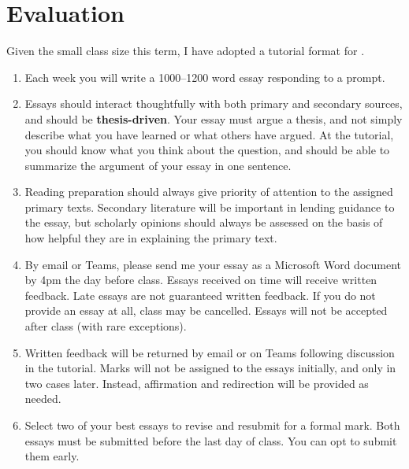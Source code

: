 \documentclass[titlepage]{article}
\begin{document}
\section{Evaluation}
\label{evaluation}

Given the small class size this term, I have adopted a tutorial format
for \ccode.

\begin{enumerate}

	\item Each week you will write a 1000–1200 word essay responding to
	a prompt.

	\item Essays should interact thoughtfully with both primary and
	secondary sources, and should be \textbf{thesis-driven}. Your essay
	must argue a thesis, and not simply describe what you have learned
	or what others have argued. At the tutorial, you should know what
	you think about the question, and should be able to summarize the
	argument of your essay in one sentence.

	\item Reading preparation should always give priority of attention
	to the assigned primary texts. Secondary literature will be
	important in lending guidance to the essay, but scholarly opinions
	should always be assessed on the basis of how helpful they are in
	explaining the primary text.

	\item By email or Teams, please send me your essay as a Microsoft
	Word document by 4pm the day before class. Essays received on time
	will receive written feedback. Late essays are not guaranteed
	written feedback. If you do not provide an essay at all, class may
	be cancelled. Essays will not be accepted after class (with rare
	exceptions).

	\item Written feedback will be returned by email or on Teams
	following discussion in the tutorial. Marks will not be assigned to
	the essays initially, and only in two cases later. Instead,
	affirmation and redirection will be provided as needed.

	\item Select two of your best essays to revise and resubmit for a
	formal mark. Both essays must be submitted before the last day of
	class. You can opt to submit them early.


\end{enumerate}
\end{document}
